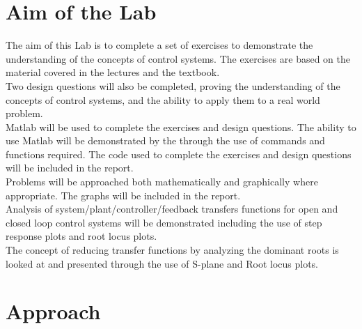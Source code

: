 \documentclass[12pt]{article}
\begin{document}



\pagebreak

\tableofcontents


\pagebreak

\section{Aim of the Lab}\label{sec:aim}

The aim of this Lab is to complete a set of exercises to demonstrate the understanding of the concepts of control systems. The exercises are based on the material covered in the lectures and the textbook. \\

Two design questions will also be completed, proving the understanding of the concepts of control systems, and the ability to apply them to a real world problem.\\

Matlab will be used to complete the exercises and design questions. The ability to use Matlab will be demonstrated by the through the use of commands and functions required.
The code used to complete the exercises and design questions will be included in the report.\\

Problems will be approached both mathematically and graphically where appropriate. The graphs will be included in the report. \\

Analysis of system/plant/controller/feedback transfers functions for open and closed loop control systems will be demonstrated including the use of step response plots and root locus plots.\\

The concept of reducing transfer functions by analyzing the dominant roots is looked at and presented through the use of S-plane and Root locus plots.\\


\section{Approach}\label{sec:approach}
\end{document}
